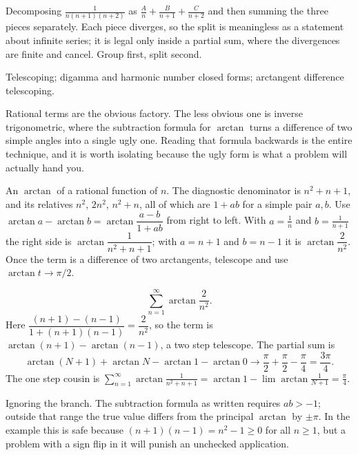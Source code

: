 \begin{trap}
Decomposing $\tfrac{1}{n(n+1)(n+2)}$ as $\tfrac{A}{n}+\tfrac{B}{n+1}+\tfrac{C}{n+2}$ and then summing the three pieces separately. Each piece diverges, so the split is meaningless as a statement about infinite series; it is legal only inside a partial sum, where the divergences are finite and cancel. Group first, split second.
\end{trap}

\begin{seealsob}Telescoping; digamma and harmonic number closed forms; arctangent difference telescoping.\end{seealsob}

Rational terms are the obvious factory. The less obvious one is inverse trigonometric, where the subtraction formula for $\arctan$ turns a difference of two simple angles into a single ugly one. Reading that formula backwards is the entire technique, and it is worth isolating because the ugly form is what a problem will actually hand you.

\cue An $\arctan$ of a rational function of $n$. The diagnostic denominator is $n^{2}+n+1$, and its relatives $n^{2}$, $2n^{2}$, $n^{2}+n$, all of which are $1+ab$ for a simple pair $a,b$.
\method Use $\arctan a-\arctan b=\arctan\dfrac{a-b}{1+ab}$ from right to left. With $a=\tfrac1n$ and $b=\tfrac1{n+1}$ the right side is $\arctan\dfrac{1}{n^{2}+n+1}$; with $a=n+1$ and $b=n-1$ it is $\arctan\dfrac{2}{n^{2}}$. Once the term is a difference of two arctangents, telescope and use $\arctan t\to\pi/2$.

\begin{worked}
\[\sum_{n=1}^{\infty}\arctan\frac{2}{n^{2}}.\]
Here $\dfrac{(n+1)-(n-1)}{1+(n+1)(n-1)}=\dfrac{2}{n^{2}}$, so the term is $\arctan(n+1)-\arctan(n-1)$, a two step telescope. The partial sum is
\[\arctan(N+1)+\arctan N-\arctan1-\arctan0\longrightarrow\frac{\pi}{2}+\frac{\pi}{2}-\frac{\pi}{4}=\frac{3\pi}{4}.\]
The one step cousin is $\displaystyle\sum_{n=1}^{\infty}\arctan\frac{1}{n^{2}+n+1}=\arctan1-\lim\arctan\frac{1}{N+1}=\frac{\pi}{4}$.
\end{worked}

\begin{trap}
Ignoring the branch. The subtraction formula as written requires $ab>-1$; outside that range the true value differs from the principal $\arctan$ by $\pm\pi$. In the example this is safe because $(n+1)(n-1)=n^{2}-1\geq0$ for all $n\geq1$, but a problem with a sign flip in it will punish an unchecked application.
\end{trap}

